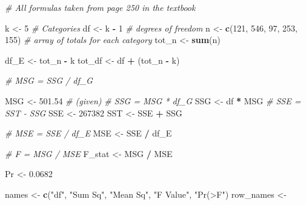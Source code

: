\documentclass[]{article}
\newenvironment{Shaded}{\begin{snugshade}}{\end{snugshade}}
\newcommand{\KeywordTok}[1]{\textcolor[rgb]{0.13,0.29,0.53}{\textbf{#1}}}
\newcommand{\DecValTok}[1]{\textcolor[rgb]{0.00,0.00,0.81}{#1}}
\newcommand{\FloatTok}[1]{\textcolor[rgb]{0.00,0.00,0.81}{#1}}
\newcommand{\StringTok}[1]{\textcolor[rgb]{0.31,0.60,0.02}{#1}}
\newcommand{\CommentTok}[1]{\textcolor[rgb]{0.56,0.35,0.01}{\textit{#1}}}
\newcommand{\OperatorTok}[1]{\textcolor[rgb]{0.81,0.36,0.00}{\textbf{#1}}}
\newcommand{\NormalTok}[1]{#1}
\begin{document}
\begin{Shaded}
\begin{Highlighting}[]
\CommentTok{# All formulas taken from page 250 in the textbook}

\NormalTok{k <-}\StringTok{ }\DecValTok{5}   \CommentTok{# Categories}
\NormalTok{df <-}\StringTok{ }\NormalTok{k }\OperatorTok{-}\StringTok{ }\DecValTok{1}   \CommentTok{# degrees of freedom}
\NormalTok{n <-}\StringTok{ }\KeywordTok{c}\NormalTok{(}\DecValTok{121}\NormalTok{, }\DecValTok{546}\NormalTok{, }\DecValTok{97}\NormalTok{, }\DecValTok{253}\NormalTok{, }\DecValTok{155}\NormalTok{)               }\CommentTok{# array of totals for each category}
\NormalTok{tot_n <-}\StringTok{ }\KeywordTok{sum}\NormalTok{(n)}

\NormalTok{df_E <-}\StringTok{ }\NormalTok{tot_n }\OperatorTok{-}\StringTok{ }\NormalTok{k}
\NormalTok{tot_df <-}\StringTok{ }\NormalTok{df }\OperatorTok{+}\StringTok{ }\NormalTok{(tot_n }\OperatorTok{-}\StringTok{ }\NormalTok{k)}

\CommentTok{# MSG = SSG / df_G}

\NormalTok{MSG <-}\StringTok{ }\FloatTok{501.54} \CommentTok{# (given)}
\CommentTok{# SSG = MSG * df_G}
\NormalTok{SSG <-}\StringTok{ }\NormalTok{df }\OperatorTok{*}\StringTok{ }\NormalTok{MSG}
\CommentTok{# SSE = SST - SSG}
\NormalTok{SSE <-}\StringTok{ }\DecValTok{267382}
\NormalTok{SST <-}\StringTok{ }\NormalTok{SSE }\OperatorTok{+}\StringTok{ }\NormalTok{SSG}

\CommentTok{# MSE = SSE / df_E}
\NormalTok{MSE <-}\StringTok{ }\NormalTok{SSE }\OperatorTok{/}\StringTok{ }\NormalTok{df_E}

\CommentTok{# F = MSG / MSE}
\NormalTok{F_stat <-}\StringTok{ }\NormalTok{MSG }\OperatorTok{/}\StringTok{ }\NormalTok{MSE}

\NormalTok{Pr <-}\StringTok{ }\FloatTok{0.0682}

\NormalTok{names <-}\StringTok{ }\KeywordTok{c}\NormalTok{(}\StringTok{"df"}\NormalTok{, }\StringTok{"Sum Sq"}\NormalTok{, }\StringTok{"Mean Sq"}\NormalTok{, }\StringTok{"F Value"}\NormalTok{, }\StringTok{"Pr(>F"}\NormalTok{)}
\NormalTok{row_names <-}\StringTok{ }


\end{Highlighting}
\end{Shaded}
\end{document}

